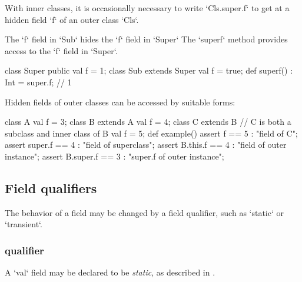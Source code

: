 With inner classes, it is occasionally necessary to 
write \xcd`Cls.super.f` to get at a hidden field \xcd`f` of an outer class
\xcd`Cls`. 

\begin{ex}
The \xcd`f` field in \xcd`Sub` hides the \xcd`f` field in \xcd`Super`
The \xcd`superf` method provides access to the \xcd`f` field in \xcd`Super`.
\begin{xten}
class Super{ 
  public val f = 1; 
}
class Sub extends Super {
  val f = true;
  def superf() : Int = super.f; // 1
}
\end{xten}
\end{ex}

\begin{ex}
Hidden fields of outer classes can be accessed by suitable forms: 
\begin{xten}
class A {
   val f = 3;
}
class B extends A {
   val f = 4;
   class C extends B {
      // C is both a subclass and inner class of B
      val f = 5;
       def example() {
         assert f         == 5 : "field of C";
         assert super.f   == 4 : "field of superclass";
         assert B.this.f  == 4 : "field of outer instance";
         assert B.super.f == 3 : "super.f of outer instance";
       }
    }
}
\end{xten}
\end{ex}

\subsection{Field qualifiers}
\label{FieldQualifier}

The behavior of a field may be changed by a field qualifier, such as
\xcd`static` or \xcd`transient`.  


\subsubsection{ qualifier}

A \xcd`val` field may be declared to be {\em static}, as described in
. 

